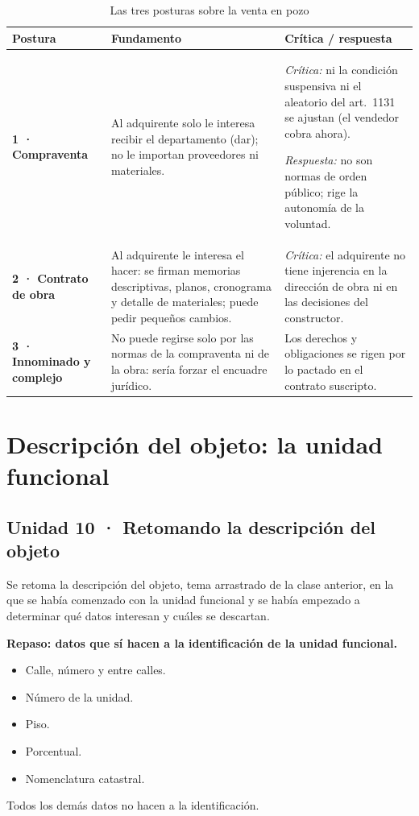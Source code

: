 \documentclass[12pt,oneside]{book}
\begin{document}
\begin{table}[H]
\centering
\caption{Las tres posturas sobre la venta en pozo}
\small
\begin{tabularx}{\textwidth}{>{\RaggedRight\arraybackslash}p{2.6cm} >{\RaggedRight\arraybackslash}X >{\RaggedRight\arraybackslash}X}
\toprule
\textbf{Postura} & \textbf{Fundamento} & \textbf{Crítica / respuesta} \\
\midrule
\textbf{1 · Compraventa} & Al adquirente solo le interesa recibir el departamento (dar); no le importan proveedores ni materiales. & \textit{Crítica:} ni la condición suspensiva ni el aleatorio del art.~1131 se ajustan (el vendedor cobra ahora).\par \textit{Respuesta:} no son normas de orden público; rige la autonomía de la voluntad. \\
\addlinespace
\textbf{2 · Contrato de obra} & Al adquirente le interesa el hacer: se firman memorias descriptivas, planos, cronograma y detalle de materiales; puede pedir pequeños cambios. & \textit{Crítica:} el adquirente no tiene injerencia en la dirección de obra ni en las decisiones del constructor. \\
\addlinespace
\textbf{3 · Innominado y complejo} & No puede regirse solo por las normas de la compraventa ni de la obra: sería forzar el encuadre jurídico. & Los derechos y obligaciones se rigen por lo pactado en el contrato suscripto. \\
\bottomrule
\end{tabularx}
\end{table}

\chapter{Descripción del objeto: la unidad funcional}

\section{Unidad 10 · Retomando la descripción del objeto}

Se retoma la descripción del objeto, tema arrastrado de la clase anterior, en la que se había comenzado con la unidad funcional y se había empezado a determinar qué datos interesan y cuáles se descartan.

\begin{note}
\textbf{Repaso: datos que sí hacen a la identificación de la unidad funcional.}
\begin{itemize}
    \item Calle, número y entre calles.
    \item Número de la unidad.
    \item Piso.
    \item Porcentual.
    \item Nomenclatura catastral.
\end{itemize}
Todos los demás datos no hacen a la identificación.
\end{note}
\end{document}

